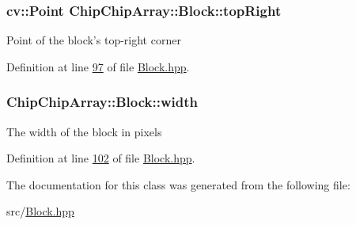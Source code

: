 \hypertarget{classChipChipArray_1_1Block_aaa4ff82846e95a628800ebdfd3ceefb5}{
\subsubsection[{top\+Right}]{\setlength{\rightskip}{0pt plus 5cm}cv\+::\+Point Chip\+Chip\+Array\+::\+Block\+::top\+Right}}\label{classChipChipArray_1_1Block_aaa4ff82846e95a628800ebdfd3ceefb5}
Point of the block's top-\/right corner 

Definition at line \hyperlink{Block_8hpp_source_l00097}{97} of file \hyperlink{Block_8hpp_source}{Block.\+hpp}.

\hypertarget{classChipChipArray_1_1Block_ac3f815e8aa9060c4ad20d4e1b2649e35}{
\subsubsection[{width}]{ Chip\+Chip\+Array\+::\+Block\+::width}}\label{classChipChipArray_1_1Block_ac3f815e8aa9060c4ad20d4e1b2649e35}
The width of the block in pixels 

Definition at line \hyperlink{Block_8hpp_source_l00102}{102} of file \hyperlink{Block_8hpp_source}{Block.\+hpp}.



The documentation for this class was generated from the following file\+:\begin{DoxyCompactItemize}
\item 
src/\hyperlink{Block_8hpp}{Block.\+hpp}\end{DoxyCompactItemize}
